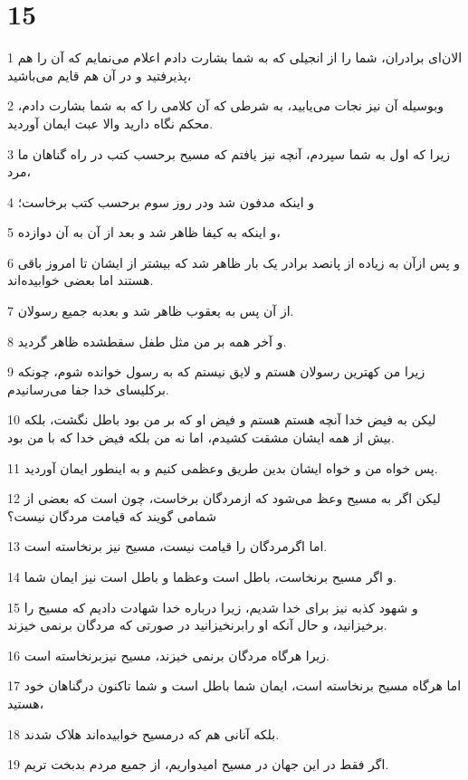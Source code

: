 \chapter{15}

\par 1 الان‌ای برادران، شما را از انجیلی که به شما بشارت دادم اعلام می‌نمایم که آن را هم پذیرفتید و در آن هم قایم می‌باشید،
\par 2 وبوسیله آن نیز نجات می‌یابید، به شرطی که آن کلامی را که به شما بشارت دادم، محکم نگاه دارید والا عبث ایمان آوردید.
\par 3 زیرا که اول به شما سپردم، آنچه نیز یافتم که مسیح برحسب کتب در راه گناهان ما مرد،
\par 4 و اینکه مدفون شد ودر روز سوم برحسب کتب برخاست؛
\par 5 و اینکه به کیفا ظاهر شد و بعد از آن به آن دوازده،
\par 6 و پس ازآن به زیاده از پانصد برادر یک بار ظاهر شد که بیشتر از ایشان تا امروز باقی هستند اما بعضی خوابیده‌اند.
\par 7 از آن پس به یعقوب ظاهر شد و بعدبه جمیع رسولان.
\par 8 و آخر همه بر من مثل طفل سقطشده ظاهر گردید.
\par 9 زیرا من کهترین رسولان هستم و لایق نیستم که به رسول خوانده شوم، چونکه برکلیسای خدا جفا می‌رسانیدم.
\par 10 لیکن به فیض خدا آنچه هستم هستم و فیض او که بر من بود باطل نگشت، بلکه بیش از همه ایشان مشقت کشیدم، اما نه من بلکه فیض خدا که با من بود.
\par 11 پس خواه من و خواه ایشان بدین طریق وعظمی کنیم و به اینطور ایمان آوردید.
\par 12 لیکن اگر به مسیح وعظ می‌شود که ازمردگان برخاست، چون است که بعضی از شمامی گویند که قیامت مردگان نیست؟
\par 13 اما اگرمردگان را قیامت نیست، مسیح نیز برنخاسته است.
\par 14 و اگر مسیح برنخاست، باطل است وعظما و باطل است نیز ایمان شما.
\par 15 و شهود کذبه نیز برای خدا شدیم، زیرا درباره خدا شهادت دادیم که مسیح را برخیزانید، و حال آنکه او رابرنخیزانید در صورتی که مردگان برنمی خیزند.
\par 16 زیرا هرگاه مردگان برنمی خیزند، مسیح نیزبرنخاسته است.
\par 17 اما هرگاه مسیح برنخاسته است، ایمان شما باطل است و شما تاکنون درگناهان خود هستید،
\par 18 بلکه آنانی هم که درمسیح خوابیده‌اند هلاک شدند.
\par 19 اگر فقط در این جهان در مسیح امیدواریم، از جمیع مردم بدبخت تریم.
